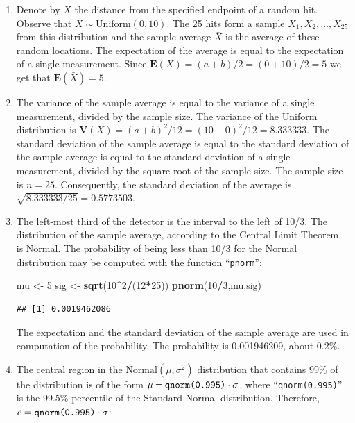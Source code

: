 \documentclass[]{krantz}
\makeatletter
\newenvironment{Shaded}{\begin{snugshade}}{\end{snugshade}}
\newcommand{\DecValTok}[1]{\textcolor[rgb]{0.00,0.00,0.81}{#1}}
\newcommand{\KeywordTok}[1]{\textcolor[rgb]{0.13,0.29,0.53}{\textbf{#1}}}
\newcommand{\NormalTok}[1]{#1}
\newcommand{\OperatorTok}[1]{\textcolor[rgb]{0.81,0.36,0.00}{\textbf{#1}}}
\newcommand{\StringTok}[1]{\textcolor[rgb]{0.31,0.60,0.02}{#1}}
\newcommand{\Expec}{\mathbf{E}}
\newcommand{\Var}{\mathbf{V}}
\newenvironment{kframe}{%
\medskip{}
\setlength{\fboxsep}{.8em}
 \def\at@end@of@kframe{}%
 \ifinner\ifhmode%
  \def\at@end@of@kframe{\end{minipage}}%
  \begin{minipage}{\columnwidth}%
 \fi\fi%
 \def\FrameCommand##1{\hskip\@totalleftmargin \hskip-\fboxsep
 \colorbox{shadecolor}{##1}\hskip-\fboxsep
     \hskip-\linewidth \hskip-\@totalleftmargin \hskip\columnwidth}%
 \MakeFramed {\advance\hsize-\width
   \@totalleftmargin\z@ \linewidth\hsize
   \@setminipage}}%
 {\par\unskip\endMakeFramed%
 \at@end@of@kframe}
\renewenvironment{Shaded}{\begin{kframe}}{\end{kframe}}
\theoremstyle{definition}
\theoremstyle{definition}
\theoremstyle{definition}
\theoremstyle{remark}
\makeatother
\begin{document}
\begin{enumerate}
\def\labelenumi{\arabic{enumi}.}
\item
  Denote by \(X\) the distance from the
  specified endpoint of a random hit. Observe that
  \(X \sim \mbox{Uniform}(0,10)\). The 25 hits form a sample
  \(X_1, X_2, \ldots, X_{25}\) from this distribution and the sample average
  \(\bar X\) is the average of these random locations. The expectation of
  the average is equal to the expectation of a single measurement. Since
  \(\Expec(X) = (a + b)/2 = (0 + 10)/2 = 5\) we get that
  \(\Expec(\bar X) = 5\).
\item
  The variance of the sample average
  is equal to the variance of a single measurement, divided by the sample
  size. The variance of the Uniform distribution is
  \(\Var(X) = (a + b)^2/12 = (10-0)^2/12 = 8.333333\). The standard
  deviation of the sample average is equal to the standard deviation of
  the sample average is equal to the standard deviation of a single
  measurement, divided by the square root of the sample size. The sample
  size is \(n=25\). Consequently, the standard deviation of the average is
  \(\sqrt{8.333333/25}=0.5773503\).
\item
  The left-most third of the detector
  is the interval to the left of 10/3. The distribution of the sample
  average, according to the Central Limit Theorem, is Normal. The
  probability of being less than 10/3 for the Normal distribution may be
  computed with the function ``\texttt{pnorm}'':

\begin{Shaded}
\begin{Highlighting}[]
\NormalTok{mu <-}\StringTok{ }\DecValTok{5}
\NormalTok{sig <-}\StringTok{ }\KeywordTok{sqrt}\NormalTok{(}\DecValTok{10}\OperatorTok{^}\DecValTok{2}\OperatorTok{/}\NormalTok{(}\DecValTok{12}\OperatorTok{*}\DecValTok{25}\NormalTok{))}
\KeywordTok{pnorm}\NormalTok{(}\DecValTok{10}\OperatorTok{/}\DecValTok{3}\NormalTok{,mu,sig)}
\end{Highlighting}
\end{Shaded}

\begin{verbatim}
## [1] 0.0019462086
\end{verbatim}

  The expectation and the standard deviation of the sample average are
  used in computation of the probability. The probability is 0.001946209,
  about 0.2\%.
\item
  The central region in the
  \(\mbox{Normal}(\mu,\sigma^2)\) distribution that contains 99\% of the
  distribution is of the form
  \(\mu \pm \mbox{\texttt{qnorm(0.995)}}\cdot \sigma\), where
  ``\texttt{qnorm(0.995)}'' is the 99.5\%-percentile of the Standard Normal
  distribution. Therefore, \(c =\mbox{\texttt{qnorm(0.995)}}\cdot \sigma\):


\end{enumerate}
\end{document}
